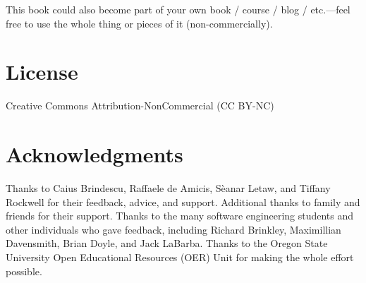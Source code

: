 \spacer
This book could also become part of your own book / course / blog / etc.---feel free to use the whole thing or pieces of it (non-commercially).

\section{License}
Creative Commons Attribution-NonCommercial (CC BY-NC)

\section{Acknowledgments}
Thanks to Caius Brindescu, Raffaele de Amicis, S\`{e}anar Letaw, and Tiffany Rockwell for their feedback, advice, and support. Additional thanks to family and friends for their support. Thanks to the many software engineering students and other individuals who gave feedback, including Richard Brinkley, Maximillian Davensmith, Brian Doyle, and Jack LaBarba. Thanks to the Oregon State University Open Educational Resources (OER) Unit for making the whole effort possible.



